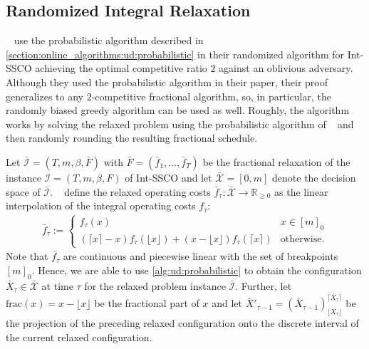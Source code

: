 \subsection{Randomized Integral Relaxation}

\citeauthor*{Albers2018}~\cite{Albers2018} use the probabilistic algorithm described in \cref{section:online_algorithms:ud:probabilistic} in their randomized algorithm for Int-SSCO achieving the optimal competitive ratio $2$ against an oblivious adversary. Although they used the probabilistic algorithm in their paper, their proof generalizes to any $2$-competitive fractional algorithm, so, in particular, the randomly biased greedy algorithm can be used as well. Roughly, the algorithm works by solving the relaxed problem using the probabilistic algorithm of \citeauthor*{Bansal2015}~\cite{Bansal2015} and then randomly rounding the resulting fractional schedule.

Let $\bar{\mathcal{I}} = (T, m, \beta, \bar{F})$ with $\bar{F} = (\bar{f}_1, \dots, \bar{f}_T)$ be the fractional relaxation of the instance $\mathcal{I} = (T, m, \beta, F)$ of Int-SSCO and let $\bar{\mathcal{X}} = [0,m]$ denote the decision space of $\bar{\mathcal{I}}$. \citeauthor*{Albers2018}~\cite{Albers2018} define the relaxed operating costs $\bar{f}_{\tau} : \bar{\mathcal{X}} \to \mathbb{R}_{\geq 0}$ as the linear interpolation of the integral operating costs $f_{\tau}$: \begin{align*}
    \bar{f}_{\tau} := \begin{cases}
        f_{\tau}(x) & x \in [m]_0 \\
        (\lceil x \rceil - x) f_{\tau}(\lfloor x \rfloor) + (x - \lfloor x \rfloor) f_{\tau}(\lceil x \rceil) & \text{otherwise}.
    \end{cases}
\end{align*} Note that $\bar{f_{\tau}}$ are continuous and piecewise linear with the set of breakpoints $[m]_0$. Hence, we are able to use \cref{alg:ud:probabilistic} to obtain the configuration $\bar{X}_{\tau} \in \bar{\mathcal{X}}$ at time $\tau$ for the relaxed problem instance  $\bar{\mathcal{I}}$. Further, let $\text{frac}(x) = x - \lfloor x \rfloor$ be the fractional part of $x$ and let $\bar{X}'_{\tau-1} = (\bar{X}_{\tau-1})_{\lfloor\bar{X}_{\tau}\rfloor}^{\lceil\bar{X}_{\tau}\rceil}$ be the projection of the preceding relaxed configuration onto the discrete interval of the current relaxed configuration.

